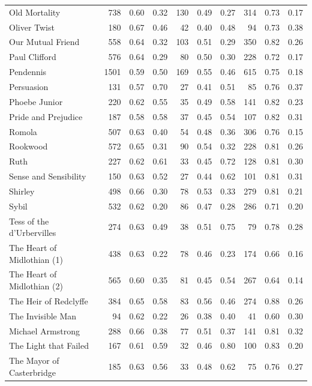 \begin{longtable}{l|rrr|rrr|rrr}
Old Mortality & 738 & 0.60 & 0.32 & 130 & 0.49 & 0.27 & 314 & 0.73 & 0.17 \\
Oliver Twist & 180 & 0.67 & 0.46 & 42 & 0.40 & 0.48 & 94 & 0.73 & 0.38 \\
Our Mutual Friend & 558 & 0.64 & 0.32 & 103 & 0.51 & 0.29 & 350 & 0.82 & 0.26 \\
Paul Clifford & 576 & 0.64 & 0.29 & 80 & 0.50 & 0.30 & 228 & 0.72 & 0.17 \\
Pendennis & 1501 & 0.59 & 0.50 & 169 & 0.55 & 0.46 & 615 & 0.75 & 0.18 \\
Persuasion & 131 & 0.57 & 0.70 & 27 & 0.41 & 0.51 & 85 & 0.76 & 0.37 \\
Phoebe Junior & 220 & 0.62 & 0.55 & 35 & 0.49 & 0.58 & 141 & 0.82 & 0.23 \\
Pride and Prejudice & 187 & 0.58 & 0.58 & 37 & 0.45 & 0.54 & 107 & 0.82 & 0.31 \\
Romola & 507 & 0.63 & 0.40 & 54 & 0.48 & 0.36 & 306 & 0.76 & 0.15 \\
Rookwood & 572 & 0.65 & 0.31 & 90 & 0.54 & 0.32 & 228 & 0.81 & 0.26 \\
Ruth & 227 & 0.62 & 0.61 & 33 & 0.45 & 0.72 & 128 & 0.81 & 0.30 \\
Sense and Sensibility & 150 & 0.63 & 0.52 & 27 & 0.44 & 0.62 & 101 & 0.81 & 0.31 \\
Shirley & 498 & 0.66 & 0.30 & 78 & 0.53 & 0.33 & 279 & 0.81 & 0.21 \\
Sybil & 532 & 0.62 & 0.20 & 86 & 0.47 & 0.28 & 286 & 0.71 & 0.20 \\
Tess of the d'Urbervilles & 274 & 0.63 & 0.49 & 38 & 0.51 & 0.75 & 79 & 0.78 & 0.28 \\
The Heart of Midlothian (1) & 438 & 0.63 & 0.22 & 78 & 0.46 & 0.23 & 174 & 0.66 & 0.16 \\
The Heart of Midlothian (2) & 565 & 0.60 & 0.35 & 81 & 0.45 & 0.54 & 267 & 0.64 & 0.14 \\
The Heir of Redclyffe & 384 & 0.65 & 0.58 & 83 & 0.56 & 0.46 & 274 & 0.88 & 0.26 \\
The Invisible Man & 94 & 0.62 & 0.22 & 26 & 0.38 & 0.40 & 41 & 0.60 & 0.30 \\
Michael Armstrong & 288 & 0.66 & 0.38 & 77 & 0.51 & 0.37 & 141 & 0.81 & 0.32 \\
The Light that Failed & 167 & 0.61 & 0.59 & 32 & 0.46 & 0.80 & 100 & 0.83 & 0.20 \\
The Mayor of Casterbridge & 185 & 0.63 & 0.56 & 33 & 0.48 & 0.62 & 75 & 0.76 & 0.27 \\

\end{longtable}
